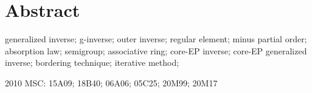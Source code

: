 \chapter*{Abstract}

\blindtext 
	
	
	\vspace{1cm}
	

	
	
	\begin{keywords}
	 generalized inverse;  g-inverse; outer inverse; regular element; minus partial order; absorption law;  semigroup; associative ring;   core-EP inverse; core-EP generalized inverse; bordering technique; iterative method;  
	\end{keywords}

\begin{classification}
2010 MSC: 15A09; 18B40; 06A06; 05C25; 20M99; 20M17
\end{classification}